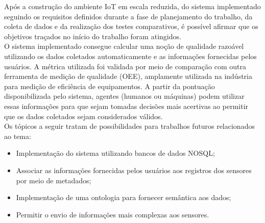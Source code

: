 \null \quad Após a construção do ambiente \acrshort{IoT} em escala reduzida, do sistema implementado seguindo os requisitos definidos durante a fase de planejamento do trabalho, da coleta de dados e da realização dos testes comparativos, é possível afirmar que os objetivos traçados no início do trabalho foram atingidos.
\\\null \quad O sistema implementado consegue calcular uma noção de qualidade razoável utilizando os dados coletados automaticamente e as informações fornecidas pelos usuários. A métrica utilizada foi validada por meio de comparação com outra ferramenta de medição de qualidade (\acrshort{OEE}), amplamente utilizada na indústria para medição de eficiência de equipamentos. A partir da pontuação disponibilizada pelo sistema, agentes (humanos ou máquinas) podem utilizar essas informações para que sejam tomadas decisões mais acertivas ao permitir que os dados coletados sejam considerados válidos.
\\\null \quad Os tópicos a seguir tratam de possibilidades para trabalhos futuros relacionados ao tema:
\begin{itemize}
  \item Implementação do sistema utilizando bancos de dados NOSQL;
  \item Associar as informações fornecidas pelos usuários aos registros dos sensores por meio de metadados;
  \item Implementação de uma ontologia para fornecer semântica aos dados;
  \item Permitir o envio de informações mais complexas aos sensores.
\end{itemize}
